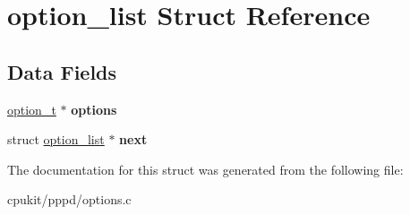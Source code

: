 \hypertarget{structoption__list}{}\section{option\+\_\+list Struct Reference}
\label{structoption__list}
\subsection*{Data Fields}
\begin{DoxyCompactItemize}
\item 
\mbox{\label{structoption__list_ad02410f391000575dc7027fbfaca44d8}} 
\mbox{\hyperlink{structoption__t}{option\+\_\+t}} $\ast$ {\bfseries options}
\item 
\mbox{\label{structoption__list_afee92081b1e08ec896a7b45b50af5313}} 
struct \mbox{\hyperlink{structoption__list}{option\+\_\+list}} $\ast$ {\bfseries next}
\end{DoxyCompactItemize}


The documentation for this struct was generated from the following file\+:\begin{DoxyCompactItemize}
\item 
cpukit/pppd/options.\+c\end{DoxyCompactItemize}
